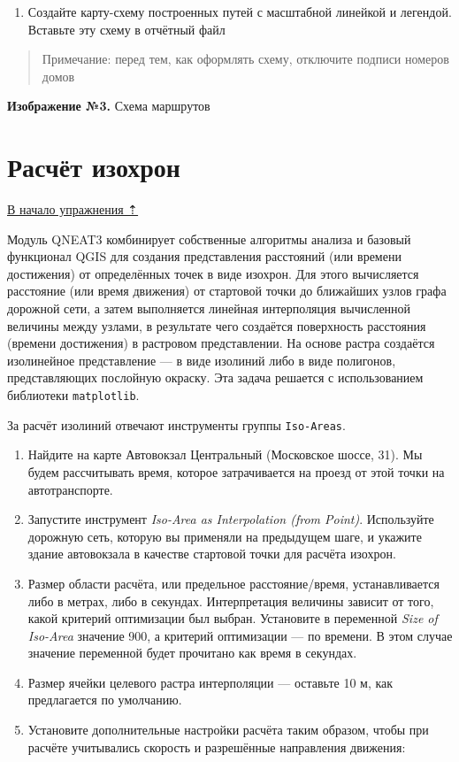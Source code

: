 \documentclass[
  12pt,
]{book}
\providecommand{\tightlist}{%
  \setlength{\itemsep}{0pt}\setlength{\parskip}{0pt}}
\begin{document}
\begin{enumerate}
\def\labelenumi{\arabic{enumi}.}
\setcounter{enumi}{17}
\tightlist
\item
  Создайте карту-схему построенных путей с масштабной линейкой и легендой. Вставьте эту схему в отчётный файл
\end{enumerate}

\begin{quote}
Примечание: перед тем, как оформлять схему, отключите подписи номеров домов
\end{quote}

\textbf{Изображение №3.} Схема маршрутов

\hypertarget{networks-isochrones}{%
\section{Расчёт изохрон}\label{networks-isochrones}}

\protect\hyperlink{networks}{В начало упражнения ⇡}

Модуль QNEAT3 комбинирует собственные алгоритмы анализа и базовый функционал QGIS для создания представления расстояний (или времени достижения) от определённых точек в виде изохрон. Для этого вычисляется расстояние (или время движения) от стартовой точки до ближайших узлов графа дорожной сети, а затем выполняется линейная интерполяция вычисленной величины между узлами, в результате чего создаётся поверхность расстояния (времени достижения) в растровом представлении. На основе растра создаётся изолинейное представление --- в виде изолиний либо в виде полигонов, представляющих послойную окраску. Эта задача решается с использованием библиотеки \texttt{matplotlib}.

За расчёт изолиний отвечают инструменты группы \texttt{Iso-Areas}.

\begin{enumerate}
\def\labelenumi{\arabic{enumi}.}
\item
  Найдите на карте Автовокзал Центральный (Московское шоссе, 31). Мы будем рассчитывать время, которое затрачивается на проезд от этой точки на автотранспорте.
\item
  Запустите инструмент \emph{Iso-Area as Interpolation (from Point)}. Используйте дорожную сеть, которую вы применяли на предыдущем шаге, и укажите здание автовокзала в качестве стартовой точки для расчёта изохрон.
\item
  Размер области расчёта, или предельное расстояние/время, устанавливается либо в метрах, либо в секундах. Интерпретация величины зависит от того, какой критерий оптимизации был выбран. Установите в переменной \emph{Size of Iso-Area} значение 900, а критерий оптимизации --- по времени. В этом случае значение переменной будет прочитано как время в секундах.
\item
  Размер ячейки целевого растра интерполяции --- оставьте 10 м, как предлагается по умолчанию.
\item
  Установите дополнительные настройки расчёта таким образом, чтобы при расчёте учитывались скорость и разрешённые направления движения:
\end{enumerate}
\end{document}
